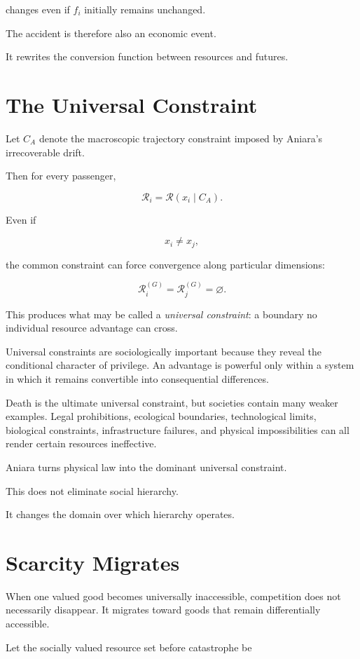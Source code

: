 \documentclass[11pt,oneside]{book}
\theoremstyle{definition}
\theoremstyle{remark}
\newcommand{\R}{\mathcal{R}}
\begin{document}
changes even if \(f_i\) initially remains unchanged.

The accident is therefore also an economic event.

It rewrites the conversion function between resources and futures.

\section{The Universal Constraint}

Let \(C_A\) denote the macroscopic trajectory constraint imposed by Aniara's irrecoverable drift.

Then for every passenger,

\[
\R_i
=
\R(x_i\mid C_A).
\]

Even if

\[
x_i\neq x_j,
\]

the common constraint can force convergence along particular dimensions:

\[
\R_i^{(G)}
=
\R_j^{(G)}
=
\varnothing.
\]

This produces what may be called a \emph{universal constraint}: a boundary no individual resource advantage can cross.

Universal constraints are sociologically important because they reveal the conditional character of privilege. An advantage is powerful only within a system in which it remains convertible into consequential differences.

Death is the ultimate universal constraint, but societies contain many weaker examples. Legal prohibitions, ecological boundaries, technological limits, biological constraints, infrastructure failures, and physical impossibilities can all render certain resources ineffective.

Aniara turns physical law into the dominant universal constraint.

This does not eliminate social hierarchy.

It changes the domain over which hierarchy operates.

\section{Scarcity Migrates}

When one valued good becomes universally inaccessible, competition does not necessarily disappear. It migrates toward goods that remain differentially accessible.

Let the socially valued resource set before catastrophe be
\end{document}
